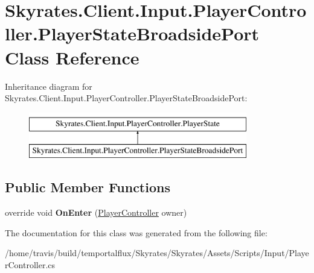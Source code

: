 \hypertarget{class_skyrates_1_1_client_1_1_input_1_1_player_controller_1_1_player_state_broadside_port}{\section{Skyrates.\-Client.\-Input.\-Player\-Controller.\-Player\-State\-Broadside\-Port Class Reference}
\label{class_skyrates_1_1_client_1_1_input_1_1_player_controller_1_1_player_state_broadside_port}
}
Inheritance diagram for Skyrates.\-Client.\-Input.\-Player\-Controller.\-Player\-State\-Broadside\-Port\-:\begin{figure}[H]
\begin{center}
\leavevmode
\includegraphics[height=2.000000cm]{class_skyrates_1_1_client_1_1_input_1_1_player_controller_1_1_player_state_broadside_port}
\end{center}
\end{figure}
\subsection*{Public Member Functions}
\begin{DoxyCompactItemize}
\item 
\hypertarget{class_skyrates_1_1_client_1_1_input_1_1_player_controller_1_1_player_state_broadside_port_af0434df8be331aad1318f7b378509c8f}{override void {\bfseries On\-Enter} (\hyperlink{class_skyrates_1_1_client_1_1_input_1_1_player_controller}{Player\-Controller} owner)}\label{class_skyrates_1_1_client_1_1_input_1_1_player_controller_1_1_player_state_broadside_port_af0434df8be331aad1318f7b378509c8f}

\end{DoxyCompactItemize}


The documentation for this class was generated from the following file\-:\begin{DoxyCompactItemize}
\item 
/home/travis/build/temportalflux/\-Skyrates/\-Skyrates/\-Assets/\-Scripts/\-Input/Player\-Controller.\-cs\end{DoxyCompactItemize}
